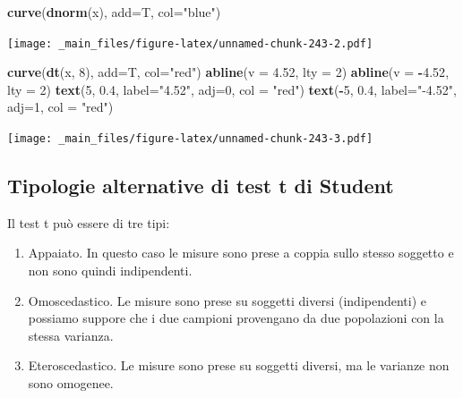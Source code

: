 \documentclass[a4paper,12pt,oneside]{book}
\providecommand{\tightlist}{%
  \setlength{\itemsep}{0pt}\setlength{\parskip}{0pt}}
\newenvironment{Shaded}{\begin{snugshade}}{\end{snugshade}}
\newcommand{\KeywordTok}[1]{\textcolor[rgb]{0.13,0.29,0.53}{\textbf{#1}}}
\newcommand{\DataTypeTok}[1]{\textcolor[rgb]{0.13,0.29,0.53}{#1}}
\newcommand{\DecValTok}[1]{\textcolor[rgb]{0.00,0.00,0.81}{#1}}
\newcommand{\FloatTok}[1]{\textcolor[rgb]{0.00,0.00,0.81}{#1}}
\newcommand{\StringTok}[1]{\textcolor[rgb]{0.31,0.60,0.02}{#1}}
\newcommand{\OperatorTok}[1]{\textcolor[rgb]{0.81,0.36,0.00}{\textbf{#1}}}
\newcommand{\NormalTok}[1]{#1}
\theoremstyle{definition}
\theoremstyle{definition}
\theoremstyle{definition}
\theoremstyle{remark}
\begin{document}
\begin{Shaded}
\begin{Highlighting}[]
\KeywordTok{curve}\NormalTok{(}\KeywordTok{dnorm}\NormalTok{(x), }\DataTypeTok{add=}\NormalTok{T, }\DataTypeTok{col=}\StringTok{"blue"}\NormalTok{)}
\end{Highlighting}
\end{Shaded}

\texttt{[image: \_main\_files/figure-latex/unnamed-chunk-243-2.pdf]}

\begin{Shaded}
\begin{Highlighting}[]
\KeywordTok{curve}\NormalTok{(}\KeywordTok{dt}\NormalTok{(x, }\DecValTok{8}\NormalTok{), }\DataTypeTok{add=}\NormalTok{T, }\DataTypeTok{col=}\StringTok{"red"}\NormalTok{)}
\KeywordTok{abline}\NormalTok{(}\DataTypeTok{v =} \FloatTok{4.52}\NormalTok{, }\DataTypeTok{lty =} \DecValTok{2}\NormalTok{)}
\KeywordTok{abline}\NormalTok{(}\DataTypeTok{v =} \OperatorTok{-}\FloatTok{4.52}\NormalTok{, }\DataTypeTok{lty =} \DecValTok{2}\NormalTok{)}
\KeywordTok{text}\NormalTok{(}\DecValTok{5}\NormalTok{, }\FloatTok{0.4}\NormalTok{, }\DataTypeTok{label=}\StringTok{"4.52"}\NormalTok{, }\DataTypeTok{adj=}\DecValTok{0}\NormalTok{, }\DataTypeTok{col =} \StringTok{"red"}\NormalTok{)}
\KeywordTok{text}\NormalTok{(}\OperatorTok{-}\DecValTok{5}\NormalTok{, }\FloatTok{0.4}\NormalTok{, }\DataTypeTok{label=}\StringTok{"-4.52"}\NormalTok{, }\DataTypeTok{adj=}\DecValTok{1}\NormalTok{, }\DataTypeTok{col =} \StringTok{"red"}\NormalTok{)}
\end{Highlighting}
\end{Shaded}

\texttt{[image: \_main\_files/figure-latex/unnamed-chunk-243-3.pdf]}

\subsection{Tipologie alternative di test t di
Student}\label{tipologie-alternative-di-test-t-di-student}

Il test t può essere di tre tipi:

\begin{enumerate}
\def\labelenumi{\arabic{enumi}.}
\tightlist
\item
  Appaiato. In questo caso le misure sono prese a coppia sullo stesso
  soggetto e non sono quindi indipendenti.
\item
  Omoscedastico. Le misure sono prese su soggetti diversi (indipendenti)
  e possiamo suppore che i due campioni provengano da due popolazioni
  con la stessa varianza.
\item
  Eteroscedastico. Le misure sono prese su soggetti diversi, ma le
  varianze non sono omogenee.
\end{enumerate}
\end{document}
